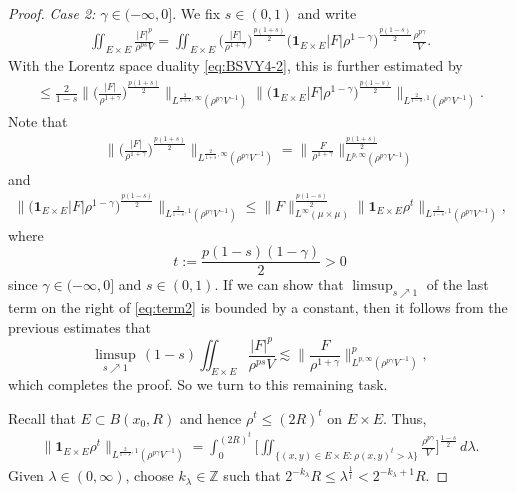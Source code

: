 \documentclass[11pt]{amsart}
\theoremstyle{definition}
\theoremstyle{remark}
\numberwithin{equation}{section}
\newcommand{\abs}[1]{|#1|}
\newcommand{\BNorm}[2]{\Big\|#1\Big\|_{#2}}
\begin{document}
\begin{proof}
\emph{Case 2: $\gamma\in(-\infty,0]$}. We fix $s\in (0,1)$ and write
\begin{align*}
\iint_{E\times E} \frac{|F|^p}{\rho^{ps}V}
=\iint_{E\times E} \Big(\frac{|F|}{\rho^{1+\gamma}}
\Big)^{\frac{p(1+s)}{2}}\Big(\mathbf{1}_{E\times E}|F|
\rho^{1-\gamma}\Big)^{\frac{p(1-s)}{2}}\frac{\rho^{p\gamma}}{V}.
\end{align*}
With the Lorentz space duality \eqref{eq:BSVY4-2}, this is further estimated by
\begin{align}
\le\frac{2}{1-s}\Big\|\Big(\frac{|F|}{\rho^{1+\gamma}}
\Big)^{\frac{p(1+s)}{2}}\Big\|_{L^{\frac{2}{1+s},\infty}(\rho^{p\gamma}V^{-1})}%
 \Big\|\Big(\mathbf{1}_{E\times E}|F|\rho^{1-\gamma}
 \Big)^{\frac{p(1-s)}{2}}\Big\|_{L^{\frac{2}{1-s},1}(\rho^{p\gamma}V^{-1})}.%
\end{align}
Note that
\begin{align}
\Big\|\Big(\frac{|F|}{\rho^{1+\gamma}}
\Big)^{\frac{p(1+s)}{2}}\Big\|_{L^{\frac{2}{1+s},\infty}(\rho^{p\gamma}V^{-1})}
=\Big\|\frac{F}{\rho^{1+\gamma}}
\Big\|_{L^{p,\infty}(\rho^{p\gamma}V^{-1})}^{\frac{p(1+s)}{2}}
\end{align}
and
\begin{align}\label{eq:term2}
\Big\|\Big(\mathbf{1}_{E\times E}|F|\rho^{1-\gamma}
\Big)^{\frac{p(1-s)}{2}}\Big\|_{L^{\frac{2}{1-s},1}(\rho^{p\gamma}V^{-1})} %
\le \|F\|_{L^\infty(\mu\times\mu)}^{\frac{p(1-s)}{2}}
\Big\|\mathbf{1}_{E\times E}\rho^{t}
\Big\|_{L^{\frac{2}{1-s},1}(\rho^{p\gamma}V^{-1})},%
\end{align}
where
\begin{equation*}
  t:=\frac{p(1-s)(1-\gamma)}{2}>0
\end{equation*}
since $\gamma\in(-\infty,0]$ and $s\in(0,1)$. If we can show that $\limsup_{s\nearrow 1}$ of
the last term on the right of \eqref{eq:term2} is bounded by a constant, then it follows
from the previous estimates that
\begin{equation*}
  \limsup_{s\nearrow 1}\, (1-s)\iint_{E\times E} \frac{\abs{F}^p}{\rho^{ps}V}\lesssim
  \BNorm{ \frac{F}{ \rho^{1+\gamma} } }{L^{p,\infty}(\rho^{p\gamma}V^{-1})}^p,
\end{equation*}
which completes the proof. So we turn to this remaining task.

Recall that $E\subset B(x_0,R)$ and hence
$\rho^{t}\le (2R)^{t}$ on $E\times E$. Thus,
\begin{align}\label{eq:need-bounded}
\Big\|\mathbf{1}_{E\times E}\rho^{t}
\Big\|_{L^{\frac{2}{1-s},1}(\rho^{p\gamma}V^{-1})} %
=
\int_{0}^{(2R)^{t}}\Big[\iint_{\{(x,y)\in E\times E:
\rho(x,y)^{t}>\lambda\}}\frac{\rho^{p\gamma}}{V}
\Big]^{\frac{1-s}{2}}\,d\lambda.
\end{align}
Given $\lambda\in (0,\infty)$, choose $k_\lambda\in\mathbb{Z}$
such that $2^{-k_\lambda}R\le \lambda^{\frac{1}{t}}<
2^{-k_{\lambda}+1}R$.


\end{proof}
\end{document}
